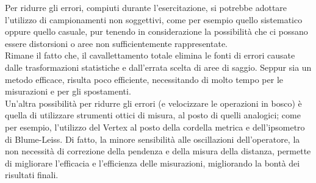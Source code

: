 Per ridurre gli errori, compiuti durante l'esercitazione, si potrebbe adottare l'utilizzo di campionamenti non soggettivi, come per esempio quello sistematico oppure quello casuale, pur tenendo in considerazione la possibilità che ci possano essere distorsioni o aree non sufficientemente rappresentate.\\
Rimane il fatto che, il cavallettamento totale elimina le fonti di errori causate dalle trasformazioni statistiche e dall'errata scelta di aree di saggio. Seppur sia un metodo efficace, risulta poco efficiente, necessitando di molto tempo per le misurazioni e per gli spostamenti.\\
Un'altra possibilità per ridurre gli errori (e velocizzare le operazioni in bosco) è quella di utilizzare strumenti ottici di misura, al posto di quelli analogici; come per esempio, l'utilizzo del Vertex al posto della cordella metrica e dell'ipsometro di Blume-Leiss. Di fatto, la minore sensibilità alle oscillazioni dell'operatore, la non necessità di correzione della pendenza e della misura della distanza, permette di migliorare l'efficacia e l'efficienza delle misurazioni, migliorando la bontà dei risultati finali. 